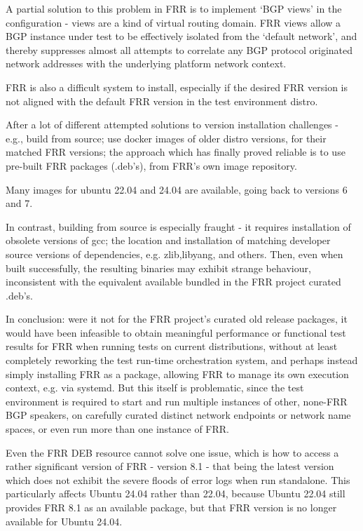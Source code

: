 A partial solution to this problem in FRR is to implement `BGP views' in the configuration - views are a kind of virtual routing domain.
FRR views allow a BGP instance under test to be effectively isolated from the `default network',
and thereby suppresses almost all attempts to correlate any BGP protocol originated network addresses with the underlying platform network context.

FRR is also a difficult system to install,
especially if the desired FRR version is not aligned with the default FRR version in the test environment distro.

After a lot of different attempted solutions to version installation challenges
- e.g., build from source; use docker images of older distro versions,
for their matched FRR versions; the approach which has finally proved reliable is to use pre-built
FRR packages (.deb's), from FRR's own image repository.

Many images for ubuntu 22.04 and 24.04 are available, going back to versions 6 and 7.

In contrast, building from source is especially fraught - it requires installation of obsolete versions of gcc; the location and installation of matching developer source versions of dependencies, e.g. zlib,libyang, and others.
Then, even when built successfully, the resulting binaries may exhibit strange behaviour, inconsistent with the equivalent available bundled in the FRR project curated .deb's.

In conclusion: were it not for the FRR project's curated old release packages, it would have been infeasible to obtain meaningful performance or functional test results for FRR when running tests on current distributions, without at least completely reworking the test run-time orchestration system, and perhaps instead simply installing FRR as a package, allowing FRR to manage its own execution context, e.g. via systemd.
But this itself is problematic, since the test environment is required to start and run multiple instances of other, none-FRR BGP speakers, on carefully curated distinct network endpoints or network name spaces, or even run more than one instance of FRR.

Even the FRR DEB resource cannot solve one issue, which is how to access a rather significant version of FRR - version 8.1 - that being the latest version which does not exhibit the severe floods of error logs when run standalone.
This particularly affects Ubuntu 24.04 rather than 22.04, because Ubuntu 22.04 still provides FRR 8.1 as an available package, but that FRR version is no longer available for Ubuntu 24.04.

